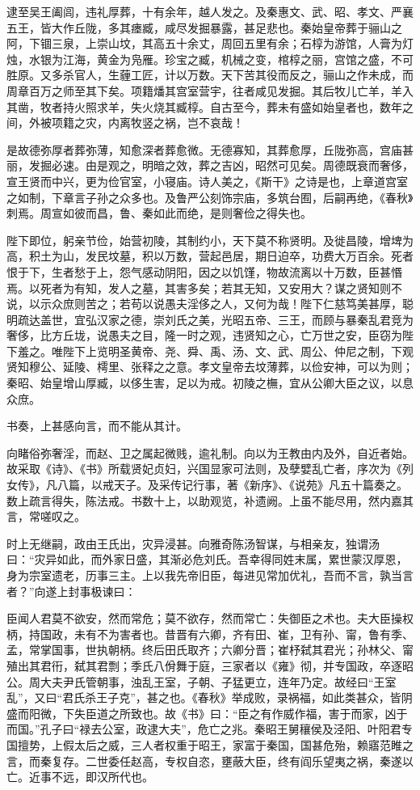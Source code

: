 \documentclass[]{article}
\begin{document}
逮至吴王阖闾，违礼厚葬，十有余年，越人发之。及秦惠文、武、昭、孝文、严襄五王，皆大作丘陇，多其瘗臧，咸尽发掘暴露，甚足悲也。秦始皇帝葬于骊山之阿，下锢三泉，上崇山坟，其高五十余丈，周回五里有余；石椁为游馆，人膏为灯烛，水银为江海，黄金为凫雁。珍宝之臧，机械之变，棺椁之丽，宫馆之盛，不可胜原。又多杀官人，生薶工匠，计以万数。天下苦其役而反之，骊山之作未成，而周章百万之师至其下矣。项籍燔其宫室营宇，往者咸见发掘。其后牧儿亡羊，羊入其凿，牧者持火照求羊，失火烧其臧椁。自古至今，葬未有盛如始皇者也，数年之间，外被项籍之灾，内离牧竖之祸，岂不哀哉！

是故德弥厚者葬弥薄，知愈深者葬愈微。无德寡知，其葬愈厚，丘陇弥高，宫庙甚丽，发掘必速。由是观之，明暗之效，葬之吉凶，昭然可见矣。周德既衰而奢侈，宣王贤而中兴，更为俭官室，小寝庙。诗人美之，《斯干》之诗是也，上章道宫室之如制，下章言子孙之众多也。及鲁严公刻饰宗庙，多筑台囿，后嗣再绝，《春秋》刺焉。周宣如彼而昌，鲁、秦如此而绝，是则奢俭之得失也。

陛下即位，躬亲节俭，始营初陵，其制约小，天下莫不称贤明。及徙昌陵，增埤为高，积土为山，发民坟墓，积以万数，营起邑居，期日迫卒，功费大万百余。死者恨于下，生者愁于上，怨气感动阴阳，因之以饥馑，物故流离以十万数，臣甚惽焉。以死者为有知，发人之墓，其害多矣；若其无知，又安用大？谋之贤知则不说，以示众庶则苦之；若苟以说愚夫淫侈之人，又何为哉！陛下仁慈笃美甚厚，聪明疏达盖世，宜弘汉家之德，崇刘氏之美，光昭五帝、三王，而顾与暴秦乱君竞为奢侈，比方丘垅，说愚夫之目，隆一时之观，违贤知之心，亡万世之安，臣窃为陛下羞之。唯陛下上览明圣黄帝、尧、舜、禹、汤、文、武、周公、仲尼之制，下观贤知穆公、延陵、樗里、张释之之意。孝文皇帝去坟薄葬，以俭安神，可以为则；秦昭、始皇增山厚臧，以侈生害，足以为戒。初陵之橅，宜从公卿大臣之议，以息众庶。

书奏，上甚感向言，而不能从其计。

向睹俗弥奢淫，而赵、卫之属起微贱，逾礼制。向以为王教由内及外，自近者始。故采取《诗》、《书》所载贤妃贞妇，兴国显家可法则，及孽嬖乱亡者，序次为《列女传》，凡八篇，以戒天子。及采传记行事，著《新序》、《说苑》凡五十篇奏之。数上疏言得失，陈法戒。书数十上，以助观览，补遗阙。上虽不能尽用，然内嘉其言，常嗟叹之。

时上无继嗣，政由王氏出，灾异浸甚。向雅奇陈汤智谋，与相亲友，独谓汤曰：``灾异如此，而外家日盛，其渐必危刘氏。吾幸得同姓末属，累世蒙汉厚恩，身为宗室遗老，历事三主。上以我先帝旧臣，每进见常加优礼，吾而不言，孰当言者？''向遂上封事极谏曰：

臣闻人君莫不欲安，然而常危；莫不欲存，然而常亡：失御臣之术也。夫大臣操权柄，持国政，未有不为害者也。昔晋有六卿，齐有田、崔，卫有孙、甯，鲁有季、孟，常掌国事，世执朝柄。终后田氏取齐；六卿分晋；崔杼弑其君光；孙林父、甯殖出其君衎，弑其君剽；季氏八佾舞于庭，三家者以《雍》彻，并专国政，卒逐昭公。周大夫尹氏管朝事，浊乱王室，子朝、子猛更立，连年乃定。故经曰``王室乱''，又曰``君氏杀王子克''，甚之也。《春秋》举成败，录祸福，如此类甚众，皆阴盛而阳微，下失臣道之所致也。故《书》曰：``臣之有作威作福，害于而家，凶于而国。''孔子曰``禄去公室，政逮大夫''，危亡之兆。秦昭王舅穰侯及泾阳、叶阳君专国擅势，上假太后之威，三人者权重于昭王，家富于秦国，国甚危殆，赖寤范睢之言，而秦复存。二世委任赵高，专权自恣，壅蔽大臣，终有阎乐望夷之祸，秦遂以亡。近事不远，即汉所代也。
\end{document}
